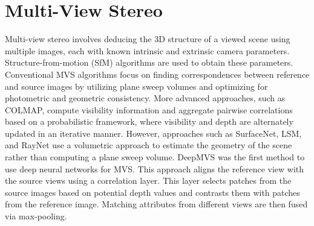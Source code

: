 \section{Multi-View Stereo}\label{sec:relwork-mvs}
Multi-view stereo involves deducing the 3D structure of a viewed scene using multiple images, each with known intrinsic and extrinsic camera parameters\cite{Furukawa2015}. Structure-from-motion (SfM) algorithms\cite{Schoenberger2016SfM} are used to obtain these parameters. Conventional MVS algorithms focus on finding correspondences between reference and source images by utilizing plane sweep volumes and optimizing for photometric and geometric consistency. More advanced approaches, such as COLMAP\cite{Schoenberger2016MVS}, compute visibility information and aggregate pairwise correlations based on a probabilistic framework, where visibility and depth are alternately updated
in an iterative manner. However, approaches such as SurfaceNet\cite{Ji_2017},  LSM\cite{kar2017learning}, and RayNet\cite{paschalidou2019raynet} use a volumetric approach to estimate the geometry of the scene rather than computing a plane sweep volume. DeepMVS\cite{Huang2018} was the first method to use deep neural networks for MVS. This approach aligns the reference view with the source views using a correlation layer. This layer selects patches from the source images based on potential depth values and contrasts them with patches from the reference image. Matching attributes from different views are then fused via max-pooling. 

